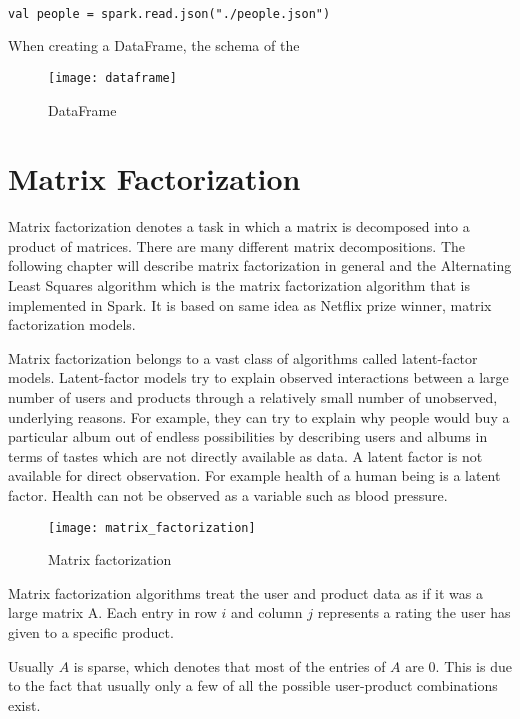 \documentclass[main.tex]{thesis.tex}
\begin{document}
\begin{lstlisting}[caption=Creating a new DataFrame by using read function]

val people = spark.read.json("./people.json")

\end{lstlisting}

When creating a DataFrame, the schema of the 

\begin{figure}[h]
	\caption{DataFrame}
	\centering
	\texttt{[image: dataframe]}
\end{figure}

\section{Matrix Factorization}

Matrix factorization denotes a task in which a matrix is decomposed into a product of matrices.
There are many different matrix decompositions.
The following chapter will describe matrix factorization in general and the Alternating Least Squares algorithm which is the matrix factorization algorithm that is implemented in Spark.
It is based on same idea as Netflix prize winner, matrix factorization models.

Matrix factorization belongs to a vast class of algorithms called latent-factor models.
Latent-factor models try to explain observed interactions between a large number of users and products through a relatively small number of unobserved, underlying reasons.
For example, they can try to explain why people would buy a particular album out of endless possibilities by describing users and albums in terms of tastes which are not directly available as data. \cite{ryza15}
A latent factor is not available for direct observation. For example health of a human being is a latent factor.
Health can not be observed as a variable such as blood pressure.

\begin{figure}[h]
	\caption{Matrix factorization \cite{ryza15}}
	\centering
	\texttt{[image: matrix\_factorization]}
\end{figure}

Matrix factorization algorithms treat the user and product data as if it was a large matrix A.
Each entry in row $i$ and column $j$ represents a rating the user has given to a specific product. \cite{ryza15}

Usually $A$ is sparse, which denotes that most of the entries of $A$ are 0.
This is due to the fact that usually only a few of all the possible user-product combinations exist.
\end{document}

